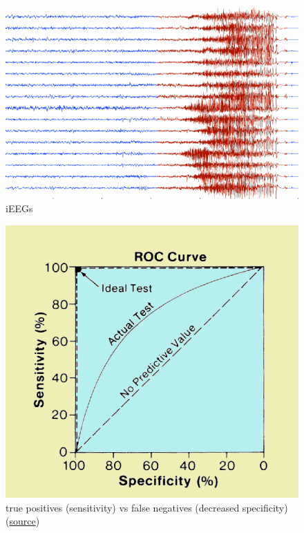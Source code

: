 \documentclass[ignorenonframetext,]{beamer}
\begin{document}
\begin{frame}

\begin{figure}[htbp]
\centering
\includegraphics{assets/presentation/GIML/eeg.png}
\caption{iEEGs}
\end{figure}

\end{frame}

\begin{frame}

\begin{figure}[htbp]
\centering
\includegraphics{assets/presentation/GIML/roc.png}
\caption{true positives (sensitivity) vs false negatives (decreased
specificity) (\href{http://www.sprawls.org/ppmi2/IMGCHAR/}{source})}
\end{figure}

\end{frame}
\end{document}

